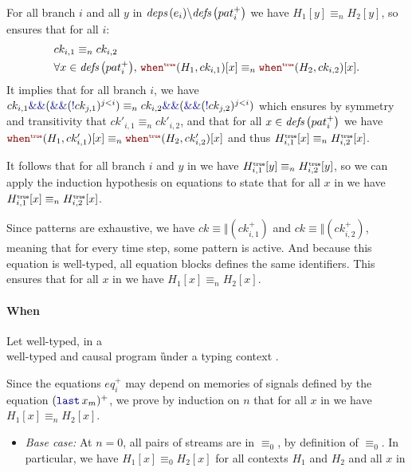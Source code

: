 \begin{skippableproof}
    For all branch $i$ and all $y$ in ${\textit{deps}\left(e_i\right)} \backslash {\ensuremath{\textit{defs}\left(pat_i^+\right)}}$ we have $H_1[y]
        \equiv_n H_2[y]$, so  ensures that for all $i$:
    \begin{align*}
         & ck_{i, 1} \equiv_n ck_{i, 2}                                                                   \\
         & \forall x \in \defs{pat_i^+}, \, \whenT{H_1}{ck_{i, 1}}[x] \equiv_n \whenT{H_2}{ck_{i, 2}}[x].
    \end{align*}
    It implies that for all branch $i$, we have
    $ck_{i, 1} \kwf{\&\&} (\kwf{\&\&}(\kwf{!}ck_{j, 1})^{j < i}) \equiv_n
        ck_{i, 2} \kwf{\&\&} (\kwf{\&\&}(\kwf{!}ck_{j, 2})^{j < i})$ which ensures by symmetry and
    transitivity that $ck'_{i, 1} \equiv_n ck'_{i, 2}$, and that for all $x \in {\ensuremath{\textit{defs}\left(pat_i^+\right)}}$ we
    have $\whenT{H_1}{ck'_{i, 1}}[x] \equiv_n \whenT{H_2}{ck'_{i, 2}}[x]$ and thus
    $H^{\mbox{\tiny\ensuremath{\mathtt{{true}}}}}_{i, 1}[x] \equiv_n H^{\mbox{\tiny\ensuremath{\mathtt{{true}}}}}_{i, 2}[x]$.

    It follows that for all branch $i$ and $y$ in  we have $H^{\mbox{\tiny\ensuremath{\mathtt{{true}}}}}_{i, 1}[y] \equiv_n
        H^{\mbox{\tiny\ensuremath{\mathtt{{true}}}}}_{i, 2}[y]$, so we can apply the induction hypothesis on equations to state that for all
    $x$ in  we have $H^{\mbox{\tiny\ensuremath{\mathtt{{true}}}}}_{i, 1}[x] \equiv_n H^{\mbox{\tiny\ensuremath{\mathtt{{true}}}}}_{i, 2}[x]$.

    Since patterns are exhaustive, we have $ck \equiv \Vert(ck_{i, 1}^+)$ and $ck \equiv \Vert
        (ck_{i, 2}^+)$, meaning that for every time step, some pattern is active. And because this
     equation is well-typed, all equation blocks defines the same identifiers. This
    ensures that for all $x$ in  we have $H_1[x] \equiv_n H_2[x]$.

    \paragraph{When}
    Let  well-typed, in a\\well-typed and
    causal program \G under a typing context \tyCtx.

    Since the equations $eq_i^+$ may depend on memories of signals defined by the 
    equation $(\last{x_m})^+$, we prove by induction on $n$ that for all $x$ in  we have $H_1[x] \equiv_n H_2[x]$.

    \begin{itemize}
        \item \textit{Base case:} At $n = 0$, all pairs of streams are in $\equiv_0$, by definition
              of $\equiv_0$. In particular, we have $H_1[x] \equiv_0 H_2[x]$ for all contexts
              $H_1$ and $H_2$ and all $x$ in 


\end{itemize}
\end{skippableproof}
